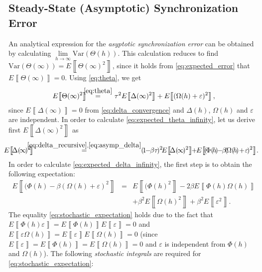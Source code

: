 \documentclass[10pt,journal,compsoc]{IEEEtran}
\newcommand{\expected}[1]{E\!\left\llbracket #1 \right\rrbracket}
\begin{document}
\subsection{Steady-State (Asymptotic) Synchronization Error}
\label{sec:app_b}
An analytical expression for the \emph{asyptotic 
	synchronization error} can be obtained by calculating 
$\underset{h\rightarrow \infty}{\lim}\mathrm{Var}(\Theta(h))$. This 
calculation reduces to find 
$\mathrm{Var}(\Theta(\infty))=\expected{\Theta(\infty)^2}$, since it holds 
from 
\eqref{eq:expected_error} that $\expected{\Theta(\infty)}=0$. Using 
\eqref{eq:theta}, we 
get
\begin{eqnarray}
\expected{\Theta(\infty)^2} &\!\!\!\!\overset{\eqref{eq:theta}}{=}\!\!\!\!& 
\tau^2\expected{\Delta(\infty)^2}  
+\expected{(\Omega(h)+\varepsilon)^2},\label{eq:expected_theta_infinity}
\end{eqnarray}
since $\expected{\Delta(\infty)}=0$ from \eqref{eq:delta_convergence} and 
$\Delta(h)$, $\Omega(h)$ and $\varepsilon$ are independent. 
In order to calculate \eqref{eq:expected_theta_infinity}, let us derive first 
$\expected{\Delta(\infty)^2}$ as
\begin{eqnarray}
\!\!\!\!\!\expected{\!\Delta(\!\infty\!)^2\!} 
&\!\!\!\!\!\!\!\overset{\eqref{eq:delta_recursive},\eqref{eq:asymp_delta}}{=}\!\!\!\!\!\!& 
(\!1\!\!-\!\!\beta\tau\!)^2\!	
\expected{\!\Delta(\!\infty\!)^2}  
\!\!+\!\!\expected{\!(\!\Phi(\!h\!)\!\!-\!\!\beta\!(\!\Omega(\!h\!)\!+\!\varepsilon\!)^2}\!. 
\label{eq:expected_delta_infinity}
\end{eqnarray}
In order to calculate \eqref{eq:expected_delta_infinity}, the first step is to 
obtain the following expectation:
\begin{eqnarray}
\expected{(\Phi(h)\!-\!\beta(\Omega(h)\!+\!\varepsilon)^2} 
&\!\!\!\!=\!\!\!\!&
\expected{(\Phi(h)^2}
\!-\!2\beta\expected{\Phi(h)\Omega(h)} 
\! \nonumber \\ 
& & +\!\beta^2\expected{\Omega(h)^2}\!+\!\beta^2\expected{\varepsilon^2}. 
\label{eq:stochastic_expectation}
\end{eqnarray}
The equality \eqref{eq:stochastic_expectation} holds due to the fact that 
$\expected{\Phi(h)\varepsilon}=\expected{\Phi(h)}\expected{\varepsilon}=0$ and 
$\expected{\varepsilon\Omega(h)}=\expected{\varepsilon}\expected{\Omega(h)}=0$ 
(since 
$\expected{\varepsilon}=\expected{\Phi(h)}=\expected{\Omega(h)}=0$ and 
$\varepsilon$ is independent from $\Phi(h)$ and $\Omega(h)$). The
following \emph{stochastic integrals} are required for 
\eqref{eq:stochastic_expectation}:
\end{document}
